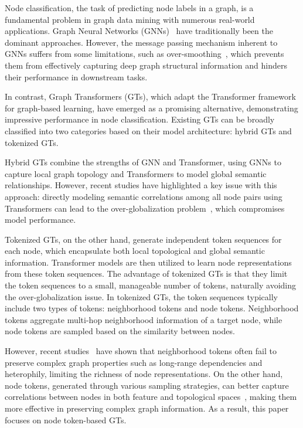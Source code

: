 
Node classification, the task of predicting node labels in a graph, is a fundamental  problem in graph data mining with numerous real-world applications. 
Graph Neural Networks (GNNs)~\cite{gnn1,gcn} have traditionally been the dominant approaches. 
However, the message passing mechanism inherent to GNNs suffers from some limitations, such as over-smoothing~\cite{oversm}, 
which prevents them from effectively capturing deep graph structural information and hinders their performance in downstream tasks. 


In contrast, Graph Transformers (GTs), which adapt the Transformer framework for graph-based learning, have emerged as a promising alternative, demonstrating impressive performance in node classification. Existing GTs can be broadly classified into two categories based on their model architecture: hybrid GTs and tokenized GTs. 

Hybrid GTs combine the strengths of GNN and Transformer, using GNNs to capture local graph topology and Transformers to model global semantic relationships. 
However, recent studies have highlighted a key issue with this approach: 
directly modeling semantic correlations among all node pairs using Transformers can lead to the over-globalization problem~\cite{cob}, which compromises model performance. 

Tokenized GTs, on the other hand, generate independent token sequences for each node, which encapsulate both local topological and global semantic information.
Transformer models are then utilized to learn node representations from these token sequences. 
The advantage of tokenized GTs is that they limit the token sequences to a small, manageable number of tokens, naturally avoiding the over-globalization issue. 
In tokenized GTs, the token sequences typically include two types of tokens: neighborhood tokens and node tokens. Neighborhood tokens aggregate multi-hop neighborhood information of a target node, while node tokens are sampled based on the similarity between nodes.

However, recent studies~\cite{vcrgt} have shown that neighborhood tokens often fail to preserve complex graph properties such as long-range dependencies and heterophily, limiting the richness of node representations. On the other hand, node tokens, generated through various sampling strategies, can better capture correlations between nodes in both feature and topological spaces~\cite{ansgt,ntformer}, making them more effective in preserving complex graph information. As a result, this paper focuses on node token-based GTs.

